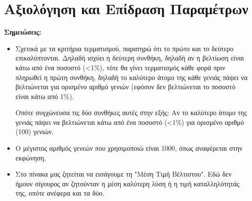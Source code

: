 \documentclass[12pt,a4paper]{article}
\begin{document}
\section{Αξιολόγηση και Επίδραση Παραμέτρων}

\textbf{Σημειώσεις:}
\begin{itemize}
    \item Σχετικά με τα κριτήρια τερματισμού, παρατηρώ ότι το πρώτο και το δεύτερο επικαλύπτονται. Δηλαδή ισχύει η δεύτερη συνθήκη, δηλαδή αν η βελτίωση είναι κάτω από ένα ποσοστό (<1\%), τότε θα γίνει τερματισμός κάθε φορά πριν πληρωθεί η πρώτη συνθήκη, δηλαδή το καλύτερο άτομο της κάθε γενιάς πάψει να βελτιώνεται για ορισμένο αριθμό γενιών (εφόσον δεν βελτιώνεται το ποσοστό είναι κάτω από 1\%).

    Οπότε συγχώνευσα τις δύο συνθήκες αυτές στην εξής: Αν το καλύτερο άτομο της γενιάς πάψει να βελτιώνεται κάτω από ένα ποσοστό (<1\%) για ορισμένο αριθμό (100) γενιών.

    \item Ο μέγιστος αριθμός γενεών που χρησιμοποιώ είναι 1000, όπως αναφέρεται στην εκφώνηση.

    \item Στο πίνακα μας ζητείται να εισάγουμε τη "Μέση Τιμή Βέλτιστου". Εδώ δεν ήμουν σίγουρος αν ζητούνταν η μέση καλύτερη λύση ή η τιμή καταλληλότητάς της, οπότε ανέφερα και τα δύο.

\end{itemize}
\end{document}
